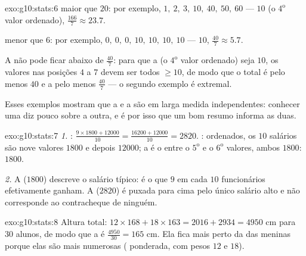 \begin{solution}{exo:g10:stats:6}
 maior que $20$: por exemplo,
$1,\ 2,\ 3,\ 10,\ 40,\ 50,\ 60$ ---  $10$ (o $4^{\text{o}}$ valor
ordenado),  $\frac{166}{7} \approx 23.7$.

 menor que $6$: por exemplo,
$0,\ 0,\ 0,\ 10,\ 10,\ 10,\ 10$ ---  $10$, 
$\frac{40}{7} \approx 5.7$.

A  não pode ficar abaixo de $\frac{40}{7}$: para que a  (o
$4^{\text{o}}$ valor ordenado) seja $10$, os valores nas posições $4$ a
$7$ devem ser todos $\geq 10$, de modo que o total é pelo menos $40$ e a
 pelo menos $\frac{40}{7}$ --- o segundo exemplo é extremal.

Esses exemplos mostram que a  e a  são em larga medida
independentes: conhecer uma diz pouco sobre a outra, e é por isso que um
bom resumo informa as duas.
\end{solution}

\begin{solution}{exo:g10:stats:7}
\emph{1.} :
$\frac{9 \times 1800 + 12000}{10} = \frac{16200 + 12000}{10} = 2820$.
: ordenados, os $10$ salários são nove valores $1800$ e depois
$12000$; a  é o  entre o $5^{\text{o}}$ e o
$6^{\text{o}}$ valores, ambos $1800$:  $1800$.

\emph{2.} A  ($1800$) descreve o salário típico: é o que $9$ em
cada $10$ funcionários efetivamente ganham. A  ($2820$) é puxada
para cima pelo único salário alto e não corresponde ao contracheque de
ninguém.
\end{solution}

\begin{solution}{exo:g10:stats:8}
Altura total: $12 \times 168 + 18 \times 163 = 2016 + 2934 = 4950$ cm
para $30$ alunos, de modo que a  é $\frac{4950}{30} = 165$ cm. Ela
fica mais perto da  das meninas porque elas são mais numerosas
( ponderada, com pesos $12$ e $18$).
\end{solution}

